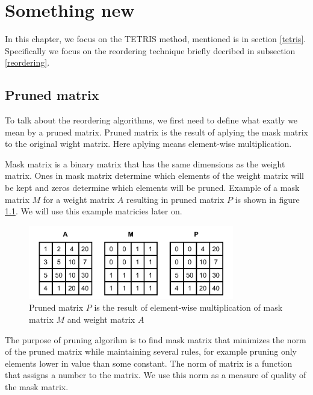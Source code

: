 \chapter{Something new}
\label{newThing}
In this chapter, we focus on the TETRIS method, mentioned is in section \ref{tetris}. Specifically we focus on the reordering technique briefly decribed in subsection \ref{reordering}. 

\section{Pruned matrix}
\label{sec:pruned_matrix}
To talk about the reordering algorithms, we first need to define what exatly we mean by a pruned matrix. Pruned matrix is the result of aplying the mask matrix to the original wight matrix. Here aplying means element-wise multiplication. 

Mask matrix is a binary matrix that has the same dimensions as the weight matrix. Ones in mask matrix determine which elements of the weight matrix will be kept and zeros determine which elements will be pruned. Example of a mask matrix $M$ for a weight matrix $A$ resulting in pruned matrix $P$ is shown in figure \ref{fig:pruned}. We will use this example matricies later on.

\begin{figure}[h]
    \centerline{\includegraphics[width=0.8\textwidth]{images/pruned}}
    \caption[Pruned matrix]{Pruned matrix $P$ is the result of element-wise multiplication of mask matrix $M$ and weight matrix $A$}
    \label{fig:pruned}
\end{figure}

The purpose of pruning algorihm is to find mask matrix that minimizes the norm of the pruned matrix while maintaining several rules, for example pruning only elements lower in value than some constant. The norm of matrix is a function that assigns a number to the matrix. We use this norm as a measure of quality of the mask matrix.

